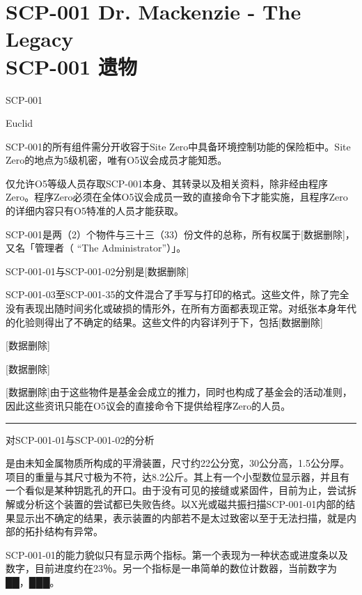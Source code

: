 \chapter[SCP-001 遗物]{
	SCP-001 Dr. Mackenzie -  The Legacy \\
	SCP-001 遗物
}

\label{chap:SCP-001.the.legacy}

SCP-001

Euclid

SCP-001的所有组件需分开收容于Site Zero中具备环境控制功能的保险柜中。Site Zero的地点为5级机密，唯有O5议会成员才能知悉。

仅允许O5等级人员存取SCP-001本身、其转录以及相关资料，除非经由程序Zero。程序Zero必须在全体O5议会成员一致的直接命令下才能实施，且程序Zero的详细内容只有O5特准的人员才能获取。

SCP-001是两（2）个物件与三十三（33）份文件的总称，所有权属于[数据删除]，又名「管理者（ “The Administrator”）」。

SCP-001-01与SCP-001-02分别是[数据删除]

SCP-001-03至SCP-001-35的文件混合了手写与打印的格式。这些文件，除了完全没有表现出随时间劣化或破损的情形外，在所有方面都表现正常。对纸张本身年代的化验则得出了不确定的结果。这些文件的内容详列于下，包括[数据删除]

[数据删除]

[数据删除]

[数据删除]由于这些物件是基金会成立的推力，同时也构成了基金会的活动准则，因此这些资讯只能在O5议会的直接命令下提供给程序Zero的人员。

\vs\hrule



对SCP-001-01与SCP-001-02的分析

是由未知金属物质所构成的平滑装置，尺寸约22公分宽，30公分高，1.5公分厚。项目的重量与其尺寸极为不符，达8.2公斤。其上有一个小型数位显示器，并且有一个看似是某种钥匙孔的开口。由于没有可见的接缝或紧固件，目前为止，尝试拆解或分析这个装置的尝试都已失败告终。以X光或磁共振扫描SCP-001-01内部的结果显示出不确定的结果，表示装置的内部若不是太过致密以至于无法扫描，就是内部的拓扑结构有异常。

SCP-001-01的能力貌似只有显示两个指标。第一个表现为一种状态或进度条以及数字，目前进度约在23％。另一个指标是一串简单的数位计数器，当前数字为██，███。

